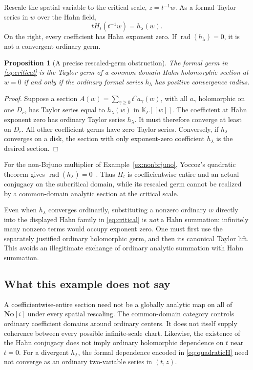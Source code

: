 \documentclass[11pt,a4paper]{article}
\numberwithin{equation}{section}
\newtheorem{proposition}[theorem]{Proposition}
\theoremstyle{definition}
\theoremstyle{remark}
\newcommand{\No}{\mathbf{No}}
\newcommand{\K}{\mathbb K}
\newcommand{\rad}{\operatorname{rad}}
\begin{document}
Rescale the spatial variable to the critical scale, $z=t^{-1}w$.
As a formal Taylor series in $w$ over the Hahn field,
\begin{equation}\label{eq:critical}
 tH_t(t^{-1}w)=h_\lambda(w).
\end{equation}
On the right, every coefficient has Hahn exponent zero. If
$\rad(h_\lambda)=0$, it is not a convergent ordinary germ.

\begin{proposition}[A precise rescaled-germ obstruction]\label{prop:critical}
The formal germ in \eqref{eq:critical} is the Taylor germ of a
common-domain Hahn-holomorphic section at $w=0$ if and only if the ordinary
formal series $h_\lambda$ has positive convergence radius.
\end{proposition}

\begin{proof}
Suppose a section $A(w)=\sum_{\gamma\ge0}t^\gamma a_\gamma(w)$, with all
$a_\gamma$ holomorphic on one $D_r$, has Taylor series equal to
$h_\lambda(w)$ in $\K_\Gamma[[w]]$. The coefficient at Hahn exponent
zero has ordinary Taylor series $h_\lambda$. It must therefore converge
at least on $D_r$. All other coefficient germs have zero Taylor series.
Conversely, if $h_\lambda$ converges on a disk, the section with only
exponent-zero coefficient $h_\lambda$ is the desired section.
\end{proof}

For the non-Brjuno multiplier of Example~\ref{ex:nonbrjuno}, Yoccoz's
quadratic theorem gives $\rad(h_\lambda)=0$~\cite{Yoccoz}.
Thus $H_t$ is coefficientwise entire and an actual conjugacy on the
subcritical domain, while its rescaled germ cannot be realized by a
common-domain analytic section at the critical scale.

Even when $h_\lambda$ converges ordinarily, substituting a nonzero ordinary
$w$ directly into the displayed Hahn family in \eqref{eq:critical} is
\emph{not} a Hahn summation: infinitely many nonzero terms would occupy
exponent zero. One must first use the separately justified ordinary
holomorphic germ, and then its canonical Taylor lift. This avoids an
illegitimate exchange of ordinary analytic summation with Hahn summation.

\subsection{What this example does not say}

A coefficientwise-entire section need not be a globally analytic map on
all of $\No[i]$ under every spatial rescaling. The common-domain category
controls ordinary coefficient domains around ordinary centers. It does
not itself supply coherence between every possible infinite-scale chart.
Likewise, the existence of the Hahn conjugacy does not imply ordinary
holomorphic dependence on $t$ near $t=0$. For a divergent $h_\lambda$, the
formal dependence encoded in \eqref{eq:quadraticH} need not converge as an
ordinary two-variable series in $(t,z)$.
\end{document}
